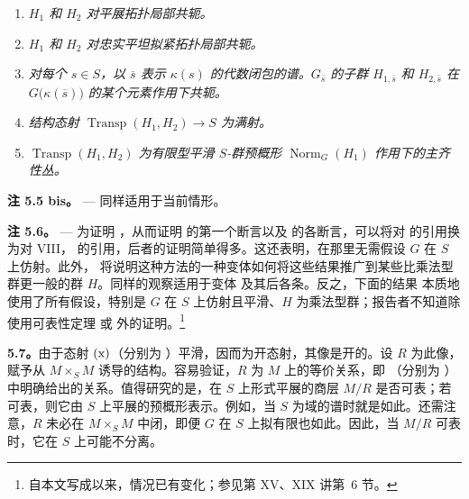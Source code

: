 \begin{enumerate}\item[(i)]\textit{\(H_1\) 和 \(H_2\) 对平展拓扑局部共轭。}

\item[(i bis)]\textit{\(H_1\) 和 \(H_2\) 对忠实平坦拟紧拓扑局部共轭。}

\item[(ii)]\textit{对每个 \(s\in S\)，以 \(\overline{s}\) 表示 \(\kappa(s)\) 的代数闭包的谱。\(G_{\overline{s}}\) 的子群 \(H_{1,\overline{s}}\) 和 \(H_{2,\overline{s}}\) 在 \(G\bigl(\kappa(\overline{s})\bigr)\) 的某个元素作用下共轭。}

\item[(ii bis)]\textit{结构态射 \(\operatorname{Transp}(H_1,H_2)\to S\) 为满射。}

\item[(iii)]\textit{\(\operatorname{Transp}(H_1,H_2)\) 为有限型平滑 \(S\)-群预概形 \(\operatorname{Norm}_G(H_1)\) 作用下的主齐性丛。}\end{enumerate}

\medskip\noindent{}\textbf{注 5.5 bis。} ---  同样适用于当前情形。

\medskip\noindent{}\textbf{注 5.6。} --- 为证明 ，从而证明  的第一个断言以及  的各断言，可以将对  的引用换为对 VIII， 的引用，后者的证明简单得多。这还表明，在那里无需假设 \(G\) 在 \(S\) 上仿射。此外， 将说明这种方法的一种变体如何将这些结果推广到某些比乘法型群更一般的群 \(H\)。同样的观察适用于变体  及其后各条。反之，下面的结果  本质地使用了所有假设，特别是 \(G\) 在 \(S\) 上仿射且平滑、\(H\) 为乘法型群；报告者不知道除使用可表性定理  或  外的证明。\footnote{自本文写成以来，情况已有变化；参见第 XV、XIX 讲第~6 节。}

\medskip\noindent{}\textbf{5.7。}由于态射 \(\mathrm{\SGARefLink{sga3:xi:display:5:x}{(x)}}\)（分别为 ）平滑，因而为开态射，其像是开的。设 \(R\) 为此像，赋予从 \(M\times_S M\) 诱导的结构。容易验证，\(R\) 为 \(M\) 上的等价关系，即 （分别为 ）中明确给出的关系。值得研究的是，在 \(S\) 上形式平展的商层 \(M/R\) 是否可表；若可表，则它由 \(S\) 上平展的预概形表示。例如，当 \(S\) 为域的谱时就是如此。还需注意，\(R\) 未必在 \(M\times_S M\) 中闭，即便 \(G\) 在 \(S\) 上拟有限也如此。因此，当 \(M/R\) 可表时，它在 \(S\) 上可能不分离。

